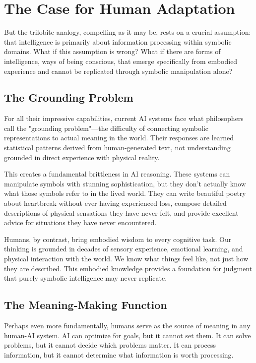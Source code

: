 \section{The Case for Human Adaptation}

But the trilobite analogy, compelling as it may be, rests on a crucial assumption: that intelligence is primarily about information processing within symbolic domains. What if this assumption is wrong? What if there are forms of intelligence, ways of being conscious, that emerge specifically from embodied experience and cannot be replicated through symbolic manipulation alone?

\subsection{The Grounding Problem}

For all their impressive capabilities, current AI systems face what philosophers call the "grounding problem"—the difficulty of connecting symbolic representations to actual meaning in the world. Their responses are learned statistical patterns derived from human-generated text, not understanding grounded in direct experience with physical reality.

This creates a fundamental brittleness in AI reasoning. These systems can manipulate symbols with stunning sophistication, but they don't actually know what those symbols refer to in the lived world. They can write beautiful poetry about heartbreak without ever having experienced loss, compose detailed descriptions of physical sensations they have never felt, and provide excellent advice for situations they have never encountered.

Humans, by contrast, bring embodied wisdom to every cognitive task. Our thinking is grounded in decades of sensory experience, emotional learning, and physical interaction with the world. We know what things feel like, not just how they are described. This embodied knowledge provides a foundation for judgment that purely symbolic intelligence may never replicate.

\subsection{The Meaning-Making Function}

Perhaps even more fundamentally, humans serve as the source of meaning in any human-AI system. AI can optimize for goals, but it cannot set them. It can solve problems, but it cannot decide which problems matter. It can process information, but it cannot determine what information is worth processing.

